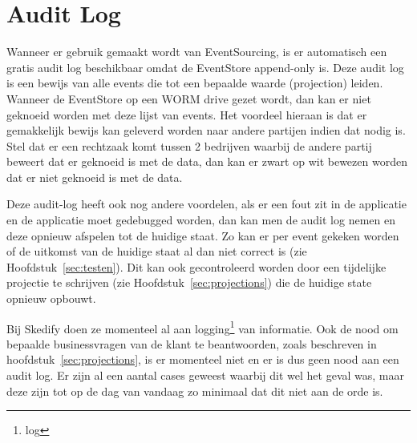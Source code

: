 
\section{Audit Log}
\label{sec:audit-log}

Wanneer er gebruik gemaakt wordt van EventSourcing, is er automatisch een gratis audit log beschikbaar omdat de EventStore append-only is. Deze audit log is een bewijs van alle events die tot een bepaalde waarde (projection) leiden. Wanneer de EventStore op een \gls{WORM} drive gezet wordt, dan kan er niet geknoeid worden met deze lijst van events. Het voordeel hieraan is dat er gemakkelijk bewijs kan geleverd worden naar andere partijen indien dat nodig is. Stel dat er een rechtzaak komt tussen 2 bedrijven waarbij de andere partij beweert dat er geknoeid is met de data, dan kan er zwart op wit bewezen worden dat er niet geknoeid is met de data.

Deze audit-log heeft ook nog andere voordelen, als er een fout zit in de applicatie en de applicatie moet gedebugged worden, dan kan men de audit log nemen en deze opnieuw afspelen tot de huidige staat. Zo kan er per event gekeken worden of de uitkomst van de huidige staat al dan niet correct is (zie Hoofdstuk~\ref{sec:testen}). Dit kan ook gecontroleerd worden door een tijdelijke projectie te schrijven (zie Hoofdstuk~\ref{sec:projections}) die de huidige \gls{state} opnieuw opbouwt.

Bij Skedify doen ze momenteel al aan logging\footnote{\glsdesc{log}} van informatie. Ook de nood om bepaalde businessvragen van de klant te beantwoorden, zoals beschreven in hoofdstuk~\ref{sec:projections}, is er momenteel niet en er is dus geen nood aan een audit log. Er zijn al een aantal cases geweest waarbij dit wel het geval was, maar deze zijn tot op de dag van vandaag zo minimaal dat dit niet aan de orde is.
